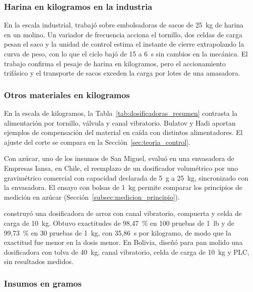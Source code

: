 \subsubsection{Harina en kilogramos en la industria}
\label{subsec:dosificadoras_industria}

En la escala industrial, \textcite{gebov2023algorithmic} trabajó sobre
embolsadoras de sacos de 25~kg de harina en un molino. Un variador de
frecuencia acciona el tornillo, dos celdas de carga pesan el saco y la unidad
de control estima el instante de cierre extrapolando la curva de peso, con lo
que el ciclo bajó de 15 a 6~s sin cambios en la mecánica. El trabajo confirma
el pesaje de harina en kilogramos, pero el accionamiento trifásico y el
transporte de sacos exceden la carga por lotes de una amasadora.

\subsubsection{Otros materiales en kilogramos}
\label{subsec:dosificadoras_kilogramos}

En la escala de kilogramos, la Tabla~\ref{tab:dosificadoras_resumen}
contrasta la alimentación por tornillo, válvula y canal vibratorio.
Bulatov y Hadi aportan ejemplos de compensación del material en caída
con distintos alimentadores. El ajuste del corte se compara en la
Sección~\ref{sec:teoria_control}.

Con azúcar, uno de los insumos de San Miguel,
\textcite{acuna2024gravimetrico} evaluó en una envasadora de Empresas Iansa,
en Chile, el reemplazo de un dosificador volumétrico por uno gravimétrico
comercial con capacidad declarada de 5~g a 25~kg, sincronizado con la
envasadora. El ensayo con bolsas de 1~kg permite comparar los principios
de medición en azúcar (Sección~\ref{subsec:medicion_principio}).

\textcite{orozco2024dosificadora} construyó una dosificadora de arroz con canal
vibratorio, compuerta y celda de carga de 10~kg. Obtuvo exactitudes de
98,47~\% en 100 pruebas de 1~lb y de 99,73~\% en 30 pruebas de 1~kg, con
35,86~s por kilogramo, de modo que la exactitud fue menor en la dosis menor.
En Bolivia, \textcite{challco2024dosificadora} diseñó para pan molido una
dosificadora con tolva de 40~kg, canal vibratorio, celda de carga de 10~kg y PLC,
sin resultados medidos.

\subsubsection{Insumos en gramos}
\label{subsec:dosificadoras_gramos}

